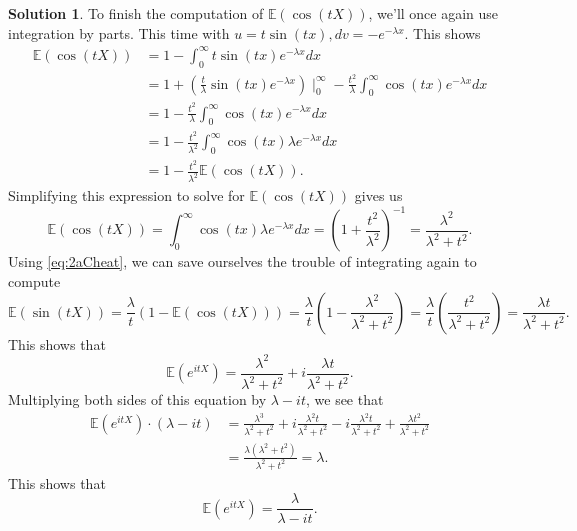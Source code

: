 \documentclass[12pt]{article}
\newcommand{\Expect}{\mathbb{E}}
\theoremstyle{definition}
\newtheorem{sol}{Solution}
\theoremstyle{remark}
\begin{document}
\begin{sol}
    To finish the computation of $\Expect(\cos(tX))$, we'll once again use integration by parts. This time with $u = t\sin(tx), dv = -e^{-\lambda x}$. This shows
    \begin{align*}
        \Expect(\cos(tX)) &= 1 - \int_{0}^{\infty} t\sin(tx)e^{-\lambda x}dx \\
                          &= 1 + (\frac{t}{\lambda} \sin(tx)e^{-\lambda x})  \mid_{0}^{\infty} - \frac{t^{2}}{\lambda}\int_{0}^{\infty } \cos(tx)e^{-\lambda x} dx\\
                          &= 1 - \frac{t^{2}}{\lambda}\int_{0}^{\infty } \cos(tx)e^{-\lambda x} dx\\
                          &= 1 - \frac{t^{2}}{\lambda^{2}}\int_{0}^{\infty } \cos(tx) \lambda e^{-\lambda x} dx\\
                          &= 1 - \frac{t^{2}}{\lambda^{2}}   \Expect(\cos(tX)).
    \end{align*}
    Simplifying this expression to solve for $\Expect(\cos(tX))$ gives us
    \begin{equation}
        \label{eq:2bShortcut}
        \Expect(\cos(tX)) = \int_{0}^{\infty } \cos(tx) \lambda e^{-\lambda x}dx = (1 + \frac{t^{2}}{\lambda^{2}} )^{-1} = \frac{\lambda^{2}}{\lambda^{2} + t^{2}}.
    \end{equation}
    Using \eqref{eq:2aCheat}, we can save ourselves the trouble of integrating again to compute 
    \begin{equation*}
        \Expect(\sin(tX)) 
        =
        \frac{\lambda}{t} ( 1 -  \Expect(\cos(tX)) ) 
        = 
        \frac{\lambda}{t} \left( 1 - \frac{\lambda^{2}}{\lambda^{2} + t^{2}} \right)
        =
        \frac{\lambda}{t} \left( \frac{t^{2}}{\lambda^{2} + t^{2}} \right)
        =
        \frac{\lambda t}{\lambda^{2} + t^{2}}.
  \end{equation*}
  This shows that 
  \begin{equation*}
      \Expect(e^{itX}) = \frac{\lambda^{2}}{\lambda^{2} + t^{2}} + i\frac{\lambda t}{\lambda^{2} + t^{2}}.
  \end{equation*}
  Multiplying both sides of this equation by $\lambda - it$, we see that
  \begin{align*}
      \Expect(e^{itX}) \cdot (\lambda - it) 
      &= 
      \frac{\lambda^{3}}{\lambda^{2} + t^{2}} + i \frac{\lambda^{2}t}{\lambda^{2}+t^{2}} 
      - i  \frac{\lambda^{2}t}{\lambda^{2}+t^{2}} + \frac{\lambda t^{2}}{\lambda^{2}+t^{2}} \\
      &=
      \frac{\lambda(\lambda^{2}+t^{2})}{\lambda^{2}+t^{2}} =  \lambda. 
  \end{align*}
  This shows that 
  \begin{equation*}
  \Expect(e^{itX}) = \frac{\lambda}{\lambda - it}. 
  \end{equation*}


\end{sol}
\end{document}
